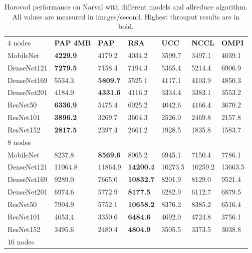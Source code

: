 \begin{table}
    \centering
    \caption[PAP-Aware Horovod Performance on Narval]{
        Horovod performance on Narval with different models and allreduce algorithm.
        All values are measured in images/second.
        Highest throuput results are in bold.
    }
    \begin{tabular}{lllllll}
     4 nodes    & \textbf{PAP 4MB} & \textbf{PAP} & \textbf{RSA} & \textbf{UCC} & \textbf{NCCL} & \textbf{OMPI} \\
    MobileNet   & \textbf{4229.9}    & 4179.2       & 4034.2  & 3599.7  & 3497.1  & 4039.1  \\
    DenseNet121 & \textbf{7279.5}    & 7158.4       & 7194.3  & 5365.4  & 5214.4  & 6906.9  \\
    DenseNet169 & 5534.3    & \textbf{5809.7}       & 5525.1  & 4117.1  & 4103.9  & 4850.3  \\
    DenseNet201 & 4184.0      & \textbf{4331.6}       & 4116.2  & 3334.4  & 3383.1  & 3553.2  \\
    ResNet50    & \textbf{6336.9}    & 5475.4       & 6025.2  & 4042.6  & 4166.4  & 3670.2  \\
    ResNet101   & \textbf{3896.2}    & 3269.7       & 3604.3  & 2526.0    & 2469.8  & 2157.8  \\
    ResNet152   & \textbf{2817.5}    & 2397.4       & 2661.2  & 1928.5  & 1835.8  & 1583.7  \\ \hline
    8 nodes     & ~ & ~ & ~     & ~     & ~    & ~    \\ 
    MobileNet   & 8237.8    & \textbf{8569.6}       & 8065.2  & 6945.1  & 7150.4  & 7786.1  \\
    DenseNet121 & 11064.8   & 11864.9      & \textbf{14200.4} & 10273.5 & 10259.2 & 13663.5 \\
    DenseNet169 & 9289.0      & 7665.0         & \textbf{10832.7} & 8201.9  & 8129.0    & 9521.4  \\
    DenseNet201 & 6974.6    & 5772.9       & \textbf{8177.5}  & 6282.9  & 6112.7  & 6879.5  \\
    ResNet50    & 7904.9    & 5752.1       & \textbf{10658.2} & 8376.2  & 8385.2  & 6516.4  \\
    ResNet101   & 4653.4    & 3350.6       & \textbf{6484.6}  & 4692.0    & 4724.8  & 3756.1  \\
    ResNet152   & 3495.6    & 2480.4       & \textbf{4804.9}  & 3505.5  & 3373.5  & 3038.8  \\ \hline
    16 nodes    & ~ & ~ & ~     & ~     & ~    & ~    \\

\end{tabular}
\end{table}
